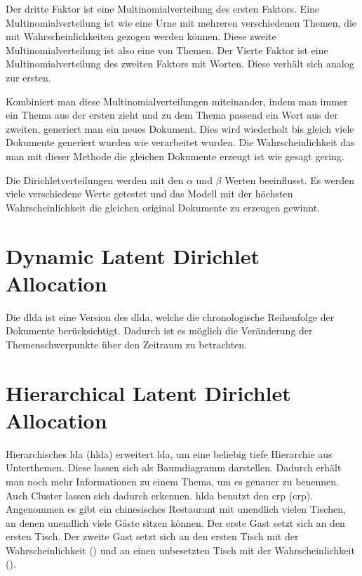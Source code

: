 Der dritte Faktor ist eine Multinomialverteilung des ersten Faktors. Eine Multinomialverteilung ist wie eine Urne mit mehreren verschiedenen Themen, die mit Wahrscheinlichkeiten gezogen werden können. Diese zweite Multinomialverteilung ist also eine von Themen. Der Vierte Faktor ist eine Multinomialverteilung des zweiten Faktors mit Worten. Diese verhält sich analog zur ersten.

Kombiniert man diese Multinomialverteilungen miteinander, indem man immer ein Thema aus der ersten zieht und zu dem Thema passend ein Wort aus der zweiten, generiert man ein neues Dokument. Dies wird wiederholt bis gleich viele Dokumente generiert wurden wie verarbeitet wurden. Die Wahrscheinlichkeit das man mit dieser Methode die gleichen Dokumente erzeugt ist wie gesagt gering.

Die Dirichletverteilungen werden mit den $\alpha$ und $\beta$ Werten beeinflusst. Es werden viele verschiedene Werte getestet und das Modell mit der höchsten Wahrscheinlichkeit die gleichen original Dokumente zu erzeugen gewinnt.






\section{Dynamic Latent Dirichlet Allocation}
Die \acrfull{dlda} ist eine Version des \acrshort{dlda}, welche die chronologische Reihenfolge der Dokumente berücksichtigt. Dadurch ist es möglich die Veränderung der Themenschwerpunkte über den Zeitraum zu betrachten. \parencite[vgl.][]{dynamicLDA}

\section{Hierarchical Latent Dirichlet Allocation}
Hierarchisches \ac{lda} (\ac{hlda}) erweitert \ac{lda}, um eine beliebig tiefe  Hierarchie aus Unterthemen. \parencite[vgl.][]{griffiths2004hierarchical} Diese lassen sich als Baumdiagramm darstellen. Dadurch erhält man noch mehr Informationen zu einem Thema, um es genauer zu benennen. Auch Cluster lassen sich dadurch erkennen. \ac{hlda} benutzt den \acl{crp} (\ac{crp}). Angenommen es gibt ein chinesisches Restaurant mit unendlich vielen Tischen, an denen unendlich viele Gäste sitzen können. Der erste Gast setzt sich an den ersten Tisch. Der zweite Gast setzt sich an den ersten Tisch mit der Wahrscheinlichkeit () und an einen unbesetzten Tisch mit der Wahrscheinlichkeit (). 